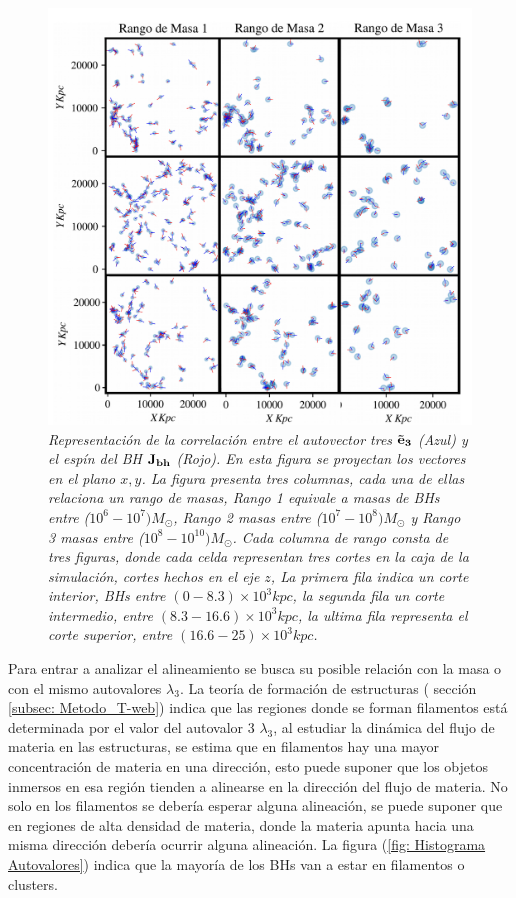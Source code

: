 \begin{figure}
    \includegraphics[width=1\textwidth]{./figures/6_Resultados/cosmo01/ll.jpeg}
   \caption{\emph{Representación de la correlación entre el autovector tres ${\bf{\vec{e}}_{3}}$ (Azul) y el espín del BH ${\bf{J_{bh}}}$ (Rojo). En esta figura se proyectan los vectores en el plano $x,y$. La figura presenta tres columnas, cada una de ellas relaciona un rango de masas, Rango 1 equivale a masas de BHs entre ($10^6-10^7)M_{\odot}$, Rango 2 masas entre ($10^7-10^8)M_{\odot}$ y Rango 3 masas entre ($10^8-10^10)M_{\odot}$. Cada columna de rango consta de tres figuras, donde cada celda  representan tres cortes en la caja de la simulación, cortes hechos en el eje $z$, La primera fila indica un corte interior, BHs entre $(0-8.3)\times10^{3} kpc$,  la segunda fila un corte intermedio, entre $(8.3-16.6)\times10^{3} kpc$, la ultima fila representa el corte superior, entre  $ (16.6-25)\times10^{3} kpc$. }}
    \label{fig: proyeccion espines}
\end{figure}


Para entrar a analizar el alineamiento se busca su posible relación con la masa o con el mismo autovalores $\lambda_{3}$. 
La teoría de formación de estructuras ( sección \ref{subsec: Metodo_T-web}) indica que las regiones donde se forman filamentos está determinada por el valor del autovalor 3 $\lambda_{3}$, al estudiar la dinámica del flujo de materia en las estructuras, se estima  que en filamentos hay una mayor concentración de materia en una dirección, esto puede suponer que los objetos inmersos en esa región tienden a alinearse en la dirección del flujo de materia. No solo en los filamentos se debería esperar alguna alineación, se puede suponer que en regiones de alta densidad de materia, donde la materia apunta hacia una misma dirección debería ocurrir alguna alineación. La figura (\ref{fig: Histograma Autovalores}) indica que la mayoría de los BHs van a estar en filamentos o clusters. 

